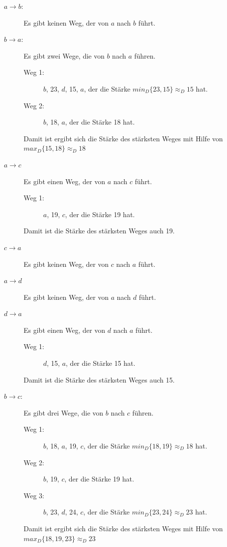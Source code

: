 \begin{description}
\item[$a \to b$:] Es gibt keinen Weg, der von $a$ nach $b$ führt.

\item[$b \to a$:] Es gibt zwei Wege, die von $b$ nach $a$ führen.
	\begin{description}
	\item[Weg 1:] $b$, 23, $d$, 15, $a$, der die Stärke $min_{D}\{23, 15 \}\approx_{D}15$ hat.
	\item[Weg 2:] $b$, 18, $a$, der die Stärke 18 hat.
	\end{description}
	Damit ist ergibt sich die Stärke des stärksten Weges mit Hilfe von $max_{D}\{15, 18\}\approx_{D}18$
	
\item[$a \to c$] Es gibt einen Weg, der von $a$ nach $c$ führt.
	\begin{description}
	\item[Weg 1:] $a$, 19, $c$, der die Stärke 19 hat.
	\end{description}
	Damit ist die Stärke des stärksten Weges auch 19.
	
\item[$c \to a$] Es gibt keinen Weg, der von $c$ nach $a$ führt.

\item[$a \to d$] Es gibt keinen Weg, der von $a$ nach $d$ führt.

\item[$d \to a$] Es gibt einen Weg, der von $d$ nach $a$ führt.
	\begin{description}
	\item[Weg 1:] $d$, 15, $a$, der die Stärke 15 hat.
	\end{description}
	Damit ist die Stärke des stärksten Weges auch 15.
	
\item[$b \to c$:] Es gibt drei Wege, die von $b$ nach $c$ führen.
	\begin{description}
	\item[Weg 1:] $b$, 18, $a$, 19, $c$, der die Stärke $min_{D}\{18, 19 \}\approx_{D}18$ hat.
	\item[Weg 2:] $b$, 19, $c$, der die Stärke 19 hat.
	\item[Weg 3:] $b$, 23, $d$, 24, $c$, der die Stärke $min_{D}\{23, 24 \}\approx_{D}23$ hat.
	\end{description}
	Damit ist ergibt sich die Stärke des stärksten Weges mit Hilfe von $max_{D}\{18, 19, 23 \}\approx_{D}23$
	

\end{description}
